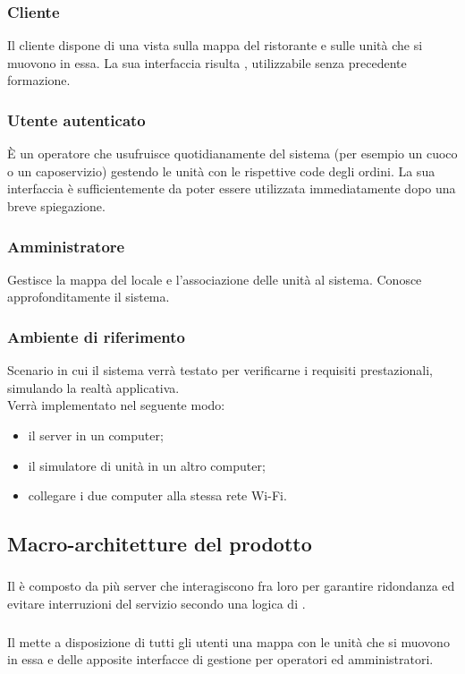     \subsubsection{Cliente}
    Il cliente dispone di una vista sulla mappa del ristorante e sulle unità che si muovono in essa. La sua interfaccia risulta , utilizzabile senza precedente formazione.

    \subsubsection{Utente autenticato}
    È un operatore che usufruisce quotidianamente del sistema (per esempio un cuoco o un caposervizio) gestendo le unità con le rispettive code degli ordini. La sua interfaccia è sufficientemente  da poter essere utilizzata immediatamente dopo una breve spiegazione.

    \subsubsection{Amministratore}
    Gestisce la mappa del locale e l'associazione delle unità al sistema. Conosce approfonditamente il sistema.
    
    \newpage
    
    \subsubsection{Ambiente di riferimento}
    Scenario in cui il sistema verrà testato per verificarne i requisiti prestazionali, simulando la realtà applicativa.\\
    Verrà implementato nel seguente modo:
    \begin{itemize}
    	\item il  server in un computer;
    	\item il simulatore di unità in un altro computer;
    	\item collegare i due computer alla stessa rete Wi-Fi.	
    \end{itemize}

\subsection{Macro-architetture del prodotto}
    \subsubsection{}
    Il  è composto da più server che interagiscono fra loro per garantire ridondanza ed evitare interruzioni del servizio secondo una logica di .

    \subsubsection{}
    Il  mette a disposizione di tutti gli utenti una mappa con le unità che si muovono in essa e delle apposite interfacce di gestione per operatori ed amministratori.